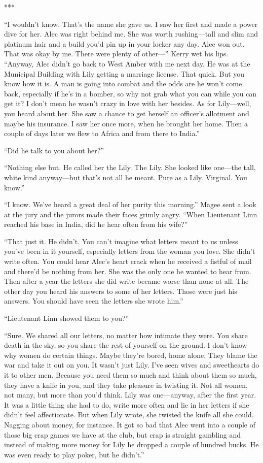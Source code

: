 \documentclass{novel}
\begin{document}
{***

“I wouldn’t know. That’s the name she gave us. I saw her first and made a power dive for her. Alec was right behind me. She was worth rushing—tall and slim and platinum hair and a build you’d pin up in your locker any day. Alec won out. That was okay by me. There were plenty of other—” Kerry wet his lips. “Anyway, Alec didn’t go back to West Amber with me next day. He was at the Municipal Building with Lily getting a marriage license. That quick. But you know how it is. A man is going into combat and the odds are he won’t come back, especially if he’s in a bomber, so why not grab what you can while you can get it? I don’t mean he wasn’t crazy in love with her besides. As for Lily—well, you heard about her. She saw a chance to get herself an officer’s allotment and maybe his insurance. I saw her once more, when he brought her home. Then a couple of days later we flew to Africa and from there to India.”

“Did he talk to you about her?”

“Nothing else but. He called her the Lily. The Lily. She looked like one—the tall, white kind anyway—but that’s not all he meant. Pure as a Lily. Virginal. You know.”

“I know. We’ve heard a great deal of her purity this morning.” Magee sent a look at the jury and the jurors made their faces grimly angry. “When Lieutenant Linn reached his base in India, did he hear often from his wife?”

“That just it. He didn’t. You can’t imagine what letters meant to us unless you’ve been in it yourself, especially letters from the woman you love. She didn’t write often. You could hear Alec’s heart crack when he received a fistful of mail and there’d be nothing from her. She was the only one he wanted to hear from. Then after a year the letters she did write became worse than none at all. The other day you heard his answers to some of her letters. Those were just his answers. You should have seen the letters she wrote him.”

“Lieutenant Linn showed them to you?”

“Sure. We shared all our letters, no matter how intimate they were. You share death in the sky, so you share the rest of yourself on the ground. I don’t know why women do certain things. Maybe they’re bored, home alone. They blame the war and take it out on you. It wasn’t just Lily. I’ve seen wives and sweethearts do it to other men. Because you need them so much and think about them so much, they have a knife in you, and they take pleasure in twisting it. Not all women, not many, but more than you’d think. Lily was one—anyway, after the first year. It was a little thing she had to do, write more often and lie in her letters if she didn’t feel affectionate. But when Lily wrote, she twisted the knife all she could. Nagging about money, for instance. It got so bad that Alec went into a couple of those big crap games we have at the club, but crap is straight gambling and instead of making more money for Lily he dropped a couple of hundred bucks. He was even ready to play poker, but he didn’t.”

}
\end{document}
